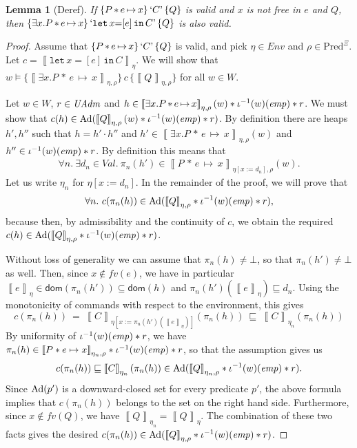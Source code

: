 \documentclass{LMCS}
\newtheorem{lemma}[theorem]{Lemma}
\theoremstyle{remark}
\newcommand{\Val}{\ensuremath{\mathit{Val}}\xspace}
\newcommand{\QUOTE}[1]{\textnormal{`\ensuremath{#1}'}}
\newcommand{\SYN}[1]{\ensuremath{\texttt{#1}}}
\newcommand{\fv}[1]{\ensuremath{\mathit{fv}(#1)}}
\newcommand{\dom}[1]{\ensuremath{\mathsf{dom}({#1})}}
\newcommand{\COMB}{\ensuremath{\cdot}}
\newcommand{\Env}{\ensuremath{\textit{Env}}\xspace}
\newcommand{\triple}[3]{{\ensuremath{\!\left.\{ #1 \}\, #2\, \{  #3 \}\!\right.}}}
\newcommand{\pointsto}{\ensuremath{\mapsto}}
\newcommand{\wemp}{\textnormal{\textit{emp}}}
\newcommand{\den}[1]{\left\llbracket #1
  \right\rrbracket}
\newcommand{\Pred}{\ensuremath{\mathrm{Pred}}\xspace}
\newcommand{\W}{\ensuremath{W}}
\newcommand{\UNFOLD}{\ensuremath{\iota^{-1}}}
\newcommand{\X}{\ensuremath{\Xi}}
\begin{document}
\begin{lemma}[Deref] 
If $\triple{P\,{*}\,e\,{\mapsto}\,x}{\QUOTE{C}}{Q}$ is valid and $x$ is not free in $e$ and $Q$, 
then $\triple{\exists x.P\,{*}\,e\,{\mapsto}\,x}{\QUOTE{\SYN{let}\,{x{=}[e]}\,\SYN{in}\,{C}}}{Q}$ is also valid. 
\end{lemma}

\begin{proof}
Assume that $\triple{P\,{*}\,e\,{\mapsto}\,x}{\QUOTE{C}}{Q}$ is valid, and pick $\eta\in\Env$ and $\rho\in\Pred^\X$. 
Let $c=\den{\SYN{let}\,{x{=}[e]}\,\SYN{in}\,{C}}_\eta$. 
We will show that $w \models\triple{\den{\exists x.P\,{*}\,e\,{\mapsto}\,x}_{\eta,\rho}}{c}{\den{Q}_{\eta,\rho}}$ for all $w \in \W$.

Let $w\in\W$, $r\in\mathit{UAdm}$ and $h\in\den{\exists x.P\,{*}\,e\,{\mapsto}\,x}_{\eta,\rho}(w) * \UNFOLD(w)(\wemp) * r$.  
We must show that $c(h)\in \DCl(\den{Q}_{\eta,\rho}(w) *\UNFOLD(w)(\wemp) * r)$. 
By definition there are heaps $h',h''$ such that $h = h'\COMB h''$ and 
$h'\in   \den{\exists x.P\,{*}\,e\,{\mapsto}\,x}_{\eta,\rho}(w)$ 
and 
$h''\in\UNFOLD(w)(\wemp) * r$.  
By definition this means that
\begin{align*}
\forall n.\ \exists d_n\in\Val.\ \pi_n(h')\in \den{P\,{*}\,e\,{\mapsto}\,x}_{\eta[x:=d_n],\rho}(w).
\end{align*}
Let us write $\eta_n$ for $\eta[x:=d_n]$. In the remainder of the proof,
we will prove that
\[
\forall n.\ c(\pi_n(h)) \in \DCl(\den{Q}_{\eta,\rho} * \UNFOLD(w)(\wemp) * r),
\]
because then, by admissibility and the continuity of $c$, we obtain 
the required
$c(h)\in \DCl(\den{Q}_{\eta,\rho} * \UNFOLD(w)(\wemp) * r)$.

Without loss of generality we can assume that $\pi_n(h) \not= \bot$, so that $\pi_n(h')\neq\bot$
as well.
Then, since $x\notin\fv{e}$, we have in particular $\den{e}_\eta\in\dom{\pi_n(h')}\subseteq\dom h$ and $\pi_n(h')(\den{e}_\eta)\sqsubseteq d_n$. 
Using the monotonicity of commands with respect to the environment, this gives 
\[
c(\pi_n(h))\ =\ \den{C}_{\eta[x := \pi_n(h')(\den{e}_\eta)]}(\pi_n(h))\ 
\sqsubseteq\ \den{C}_{\eta_n}(\pi_n(h))
\]
By uniformity of $\UNFOLD(w)(\wemp) * r$, we have 
$\pi_n(h)\in \den{P * e\pointsto x}_{\eta_n,\rho} * \UNFOLD(w)(\wemp) * r$, so that the assumption gives us 
\begin{align*}
c(\pi_n(h))\sqsubseteq \den{C}_{\eta_n}(\pi_n(h)) \in\DCl(\den{Q}_{\eta_n,\rho} * \UNFOLD(w)(\wemp) * r) .
\end{align*}
Since $\mathrm{Ad}(p')$ is a downward-closed set for every predicate $p'$, the above
formula implies that $c(\pi_n(h))$ belongs to the set on the right hand side.
Furthermore, since $x\notin\fv{Q}$, we have $\den{Q}_{\eta_n} = \den{Q}_\eta$. The combination
of these two facts
gives the desired $c(\pi_n(h)) \in \DCl(\den{Q}_{\eta,\rho} * \UNFOLD(w)(\wemp) * r)$.
\end{proof}
\end{document}
